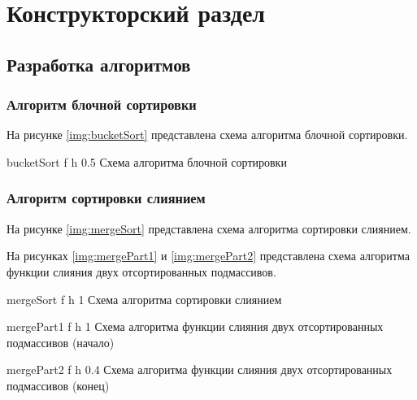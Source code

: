 \chapter{Конструкторский раздел}

\section{Разработка алгоритмов}

\subsection{Алгоритм блочной сортировки}

На рисунке \ref{img:bucketSort} представлена схема алгоритма блочной сортировки.

{bucketSort} %
{f} %
{h} %
{0.5\textwidth} %
{Схема алгоритма блочной сортировки} %

\clearpage

\subsection{Алгоритм сортировки слиянием}

На рисунке \ref{img:mergeSort} представлена схема алгоритма сортировки слиянием.

На рисунках \ref{img:mergePart1} и \ref{img:mergePart2} представлена схема алгоритма функции слияния двух отсортированных подмассивов.

{mergeSort} %
{f} %
{h} %
{1\textwidth} %
{Схема алгоритма сортировки слиянием} %

{mergePart1} %
{f} %
{h} %
{1\textwidth} %
{Схема алгоритма функции слияния двух отсортированных подмассивов (начало)} %

{mergePart2} %
{f} %
{h} %
{0.4\textwidth} %
{Схема алгоритма функции слияния двух отсортированных подмассивов (конец)} %

